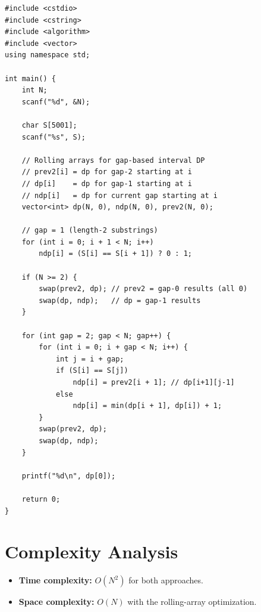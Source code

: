 \documentclass[11pt,a4paper]{article}
\begin{document}
\begin{lstlisting}
#include <cstdio>
#include <cstring>
#include <algorithm>
#include <vector>
using namespace std;

int main() {
    int N;
    scanf("%d", &N);

    char S[5001];
    scanf("%s", S);

    // Rolling arrays for gap-based interval DP
    // prev2[i] = dp for gap-2 starting at i
    // dp[i]    = dp for gap-1 starting at i
    // ndp[i]   = dp for current gap starting at i
    vector<int> dp(N, 0), ndp(N, 0), prev2(N, 0);

    // gap = 1 (length-2 substrings)
    for (int i = 0; i + 1 < N; i++)
        ndp[i] = (S[i] == S[i + 1]) ? 0 : 1;

    if (N >= 2) {
        swap(prev2, dp); // prev2 = gap-0 results (all 0)
        swap(dp, ndp);   // dp = gap-1 results
    }

    for (int gap = 2; gap < N; gap++) {
        for (int i = 0; i + gap < N; i++) {
            int j = i + gap;
            if (S[i] == S[j])
                ndp[i] = prev2[i + 1]; // dp[i+1][j-1]
            else
                ndp[i] = min(dp[i + 1], dp[i]) + 1;
        }
        swap(prev2, dp);
        swap(dp, ndp);
    }

    printf("%d\n", dp[0]);

    return 0;
}
\end{lstlisting}

\section{Complexity Analysis}

\begin{itemize}
  \item \textbf{Time complexity:} $O(N^2)$ for both approaches.
  \item \textbf{Space complexity:} $O(N)$ with the rolling-array optimization.
\end{itemize}
\end{document}
